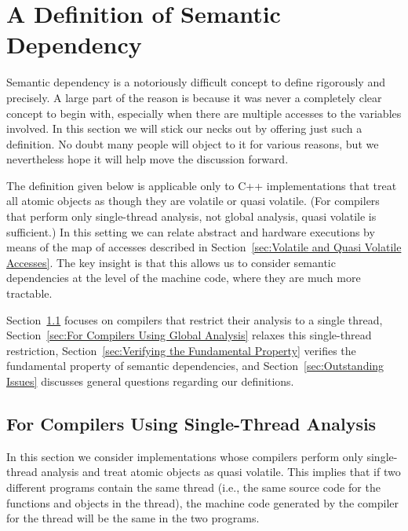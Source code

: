 \documentclass[10]{article}
\begin{document}
\section{A Definition of Semantic Dependency}
\label{sec:A Definition of Semantic Dependency}

Semantic dependency is a notoriously difficult concept to define
rigorously and precisely.
A large part of the reason is because it was never a completely clear
concept to begin with, especially when there are multiple accesses to
the variables involved.
In this section we will stick our necks out by offering just such a
definition.
No doubt many people will object to it for various reasons, but we
nevertheless hope it will help move the discussion forward.

The definition given below is applicable only to C++ implementations
that treat all atomic objects as though they are volatile or
quasi volatile.
(For compilers that perform only single-thread analysis, not global
analysis, quasi volatile is sufficient.)
In this setting we can relate abstract and hardware executions by
means of the map of accesses described in
Section~\ref{sec:Volatile and Quasi Volatile Accesses}.
The key insight is that this allows us to consider semantic
dependencies at the level of the machine code, where they are much
more tractable.

Section~\ref{sec:For Compilers Using Single-Thread Analysis}
focuses on compilers that restrict their analysis to a single
thread,
Section~\ref{sec:For Compilers Using Global Analysis}
relaxes this single-thread restriction,
Section~\ref{sec:Verifying the Fundamental Property}
verifies the fundamental property of semantic dependencies,
and
Section~\ref{sec:Outstanding Issues}
discusses general questions regarding our definitions.

\subsection{For Compilers Using Single-Thread Analysis}
\label{sec:For Compilers Using Single-Thread Analysis}

In this section we consider implementations whose compilers perform
only single-thread analysis and treat atomic objects as
quasi volatile.
This implies that if two different programs contain the same thread
(i.e., the same source code for the functions and objects in the thread), the
machine code generated by the compiler for the thread will be the
same in the two programs.
\end{document}
